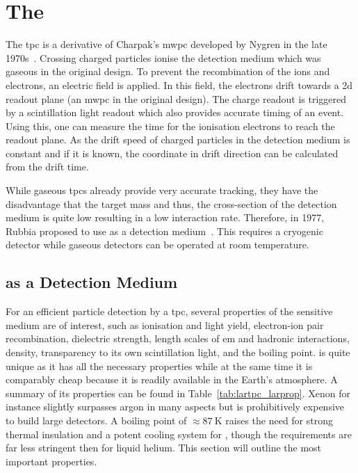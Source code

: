 \chapter{The }
\label{chap:lartpc}

The \gls{tpc} is a derivative of Charpak's \gls{mwpc}\cite{mwpc} developed by Nygren in the late 1970s~\cite{nygrenTPC}.
Crossing charged particles ionise the detection medium which was gaseous in the original design.
To prevent the recombination of the ions and electrons, an electric field is applied.
In this field, the electrons drift towards a \gls{2d} readout plane (an \gls{mwpc} in the original design).
The charge readout is triggered by a scintillation light readout which also provides accurate timing of an event.
Using this, one can measure the time for the ionisation electrons to reach the readout plane.
As the drift speed of charged particles in the detection medium is constant and if it is known, the coordinate in drift direction can be calculated from the drift time.

While gaseous \glspl{tpc} already provide very accurate tracking, they have the disadvantage that the target mass and thus, the cross-section of the detection medium is quite low resulting in a low interaction rate.
Therefore, in 1977, Rubbia proposed to use \lar{} as a detection medium~\cite{lartpc}.
This requires a cryogenic detector while gaseous detectors can be operated at room temperature.


\section{ as a Detection Medium}
\label{sec:lartpc_lar}

For an efficient particle detection by a \gls{tpc}, several properties of the sensitive medium are of interest, such as ionisation and light yield, electron-ion pair recombination, dielectric strength, length scales of \gls{em} and hadronic interactions, density, transparency to its own scintillation light, and the boiling point.
\lar{} is quite unique as it has all the necessary properties while at the same time it is comparably cheap because it is readily available in the Earth's atmosphere.
A summary of its properties can be found in Table~\ref{tab:lartpc_larprop}.
Xenon for instance slightly surpasses argon in many aspects but is prohibitively expensive to build large detectors.
A boiling point of $\approx \SI{87}{\kelvin}$ raises the need for strong thermal insulation and a potent cooling system for \lar{}, though the requirements are far less stringent then for liquid helium.
This section will outline the most important \lar{} properties.

